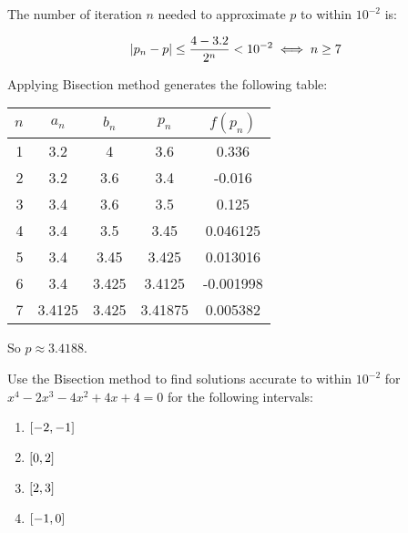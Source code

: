 \documentclass[../../../../Assignments.tex]{subfiles}
\begin{document}
\begin{solution}
\begin{enumerate}[label = (\alph*)]
            The number of iteration \(n\) needed to approximate \(p\) to within
            \(10^{-2}\) is:

            \[\abs{p_n - p} \leq \frac{4 - \num{3.2}}{2^n} < 10^{-2} \iff n \geq 7\]

            Applying Bisection method generates the following table:

            \begin{table}[H]
                \centering
                \begin{tabular}{r S[table-format=1.5] S[table-format=1.6] S[table-format=1.6] S[table-format=-1.6]}
                    \toprule
                    \(n\)  &  {\(a_n\)}  &  {\(b_n\)}  &  {\(p_n\)}  &  {\(f(p_n)\)}  \\
                      &  3.2        &  4          &  3.6        &   0.336        \\
                        2  &  3.2        &  3.6        &  3.4        &  -0.016        \\
                        3  &  3.4        &  3.6        &  3.5        &   0.125        \\
                        4  &  3.4        &  3.5        &  3.45       &   0.046125     \\
                        5  &  3.4        &  3.45       &  3.425      &   0.013016     \\
                        6  &  3.4        &  3.425      &  3.4125     &  -0.001998     \\
                        7  &  3.4125     &  3.425      &  3.41875    &   0.005382     \\
                    \bottomrule
                \end{tabular}
            \end{table}

            So \(p \approx \num{3.4188}\).
    \end{enumerate}
\end{solution}

\begin{exercise}
    Use the Bisection method to find solutions accurate to within \(10^{-2}\)
    for \(x^4 - 2x^3 - 4x^2 + 4x + 4 = 0\) for the following intervals:

    \begin{multicols}{4}
        \begin{enumerate}[label = (\alph*)]
            \item \(\interval{-2}{-1}\)
            \item \(\interval{0}{2}\)
            \item \(\interval{2}{3}\)
            \item \(\interval{-1}{0}\)
        \end{enumerate}
    \end{multicols}
\end{exercise}
\end{document}
